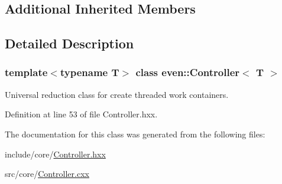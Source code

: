 \subsection*{Additional Inherited Members}


\subsection{Detailed Description}
\subsubsection*{template$<$typename T$>$\newline
class even\+::\+Controller$<$ T $>$}

Universal reduction class for create threaded work containers. 

Definition at line 53 of file Controller.\+hxx.



The documentation for this class was generated from the following files\+:\begin{DoxyCompactItemize}
\item 
include/core/\mbox{\hyperlink{_controller_8hxx}{Controller.\+hxx}}\item 
src/core/\mbox{\hyperlink{_controller_8cxx}{Controller.\+cxx}}\end{DoxyCompactItemize}
